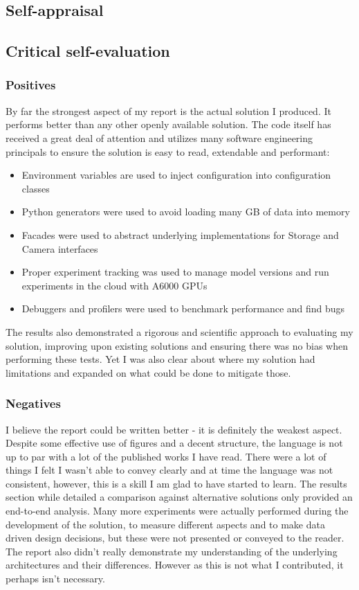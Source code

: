 \begin{appendices}

%
%
\chapter{Self-appraisal}

\section{Critical self-evaluation}
\subsection{Positives}
By far the strongest aspect of my report is the actual solution I produced.  It performs better than any other openly available solution.  
The code itself has received a great deal of attention and utilizes many software engineering principals to ensure the solution is easy to 
read, extendable and performant:  
\begin{itemize}
    \item Environment variables are used to inject configuration into configuration classes  
    \item Python generators were used to avoid loading many GB of data into memory  
    \item Facades were used to abstract underlying implementations for Storage and Camera interfaces  
    \item Proper experiment tracking was used to manage model versions and run experiments in the cloud with A6000 GPUs
    \item Debuggers and profilers were used to benchmark performance and find bugs
\end{itemize}
The results also demonstrated a rigorous and scientific approach to evaluating my solution, improving upon existing solutions and ensuring there was 
no bias when performing these tests.  Yet I was also clear about where my solution had limitations and expanded on what could be done 
to mitigate those.

\subsection{Negatives}
I believe the report could be written better - it is definitely the weakest aspect. 
Despite some effective use of figures and a decent structure, the language is not up to par with a lot of the published works I have read.  
There were a lot of things I felt I wasn't able to convey clearly and at time the language was not consistent, 
however, this is a skill I am glad to have started to learn.
The results section while detailed a comparison against alternative solutions only provided an end-to-end analysis.  
Many more experiments were actually performed during the development of the solution, to measure different aspects and to make data driven design decisions, but 
these were not presented or conveyed to the reader.
The report also didn't really demonstrate my understanding of the underlying architectures and their differences.  However as this is not what I contributed, it 
perhaps isn't necessary.


\end{appendices}
